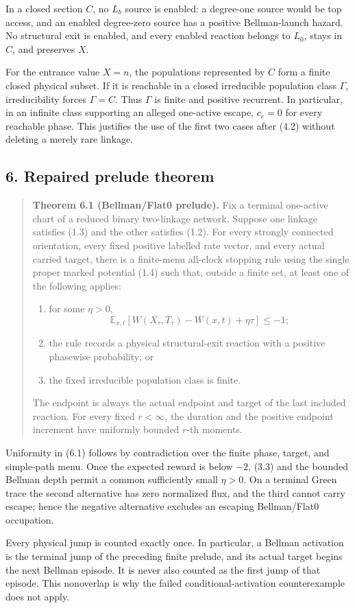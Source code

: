 In a closed section \(C\), no \(L_b\) source is enabled: a degree-one
source would be top access, and an enabled degree-zero source has a
positive Bellman-launch hazard. No structural exit is enabled, and every
enabled reaction belongs to \(L_0\), stays in \(C\), and preserves
\(X\).

For the entrance value \(X=n\), the populations represented by \(C\)
form a finite closed physical subset. If it is reachable in a closed
irreducible population class \(\Gamma\), irreducibility forces
\(\Gamma=C\). Thus \(\Gamma\) is finite and positive recurrent. In
particular, in an infinite class supporting an alleged one-active
escape, \(c_e=0\) for every reachable phase. This justifies the use of
the first two cases after (4.2) without deleting a merely rare linkage.

\subsection{6. Repaired prelude theorem}

\begin{quote}
\textbf{Theorem 6.1 (Bellman/Flat0 prelude).} Fix a terminal one-active
chart of a reduced binary two-linkage network. Suppose one linkage
satisfies (1.3) and the other satisfies (1.2). For every strongly
connected orientation, every fixed positive labelled rate vector, and
every actual carried target, there is a finite-menu all-clock stopping
rule using the single proper marked potential (1.4) such that, outside a
finite set, at least one of the following applies:

\begin{enumerate}
\def\labelenumi{\arabic{enumi}.}
\tightlist
\item
  for some \(\eta>0\), \[
     \mathbb E_{x,t}[W(X_\tau,T_\tau)-W(x,t)+\eta\tau]\le-1; \tag{6.1}
  \]
\item
  the rule records a physical structural-exit reaction with a positive
  phasewise probability; or
\item
  the fixed irreducible population class is finite.
\end{enumerate}

The endpoint is always the actual endpoint and target of the last
included reaction. For every fixed \(r<\infty\), the duration and the
positive endpoint increment have uniformly bounded \(r\)-th moments.
\end{quote}

Uniformity in (6.1) follows by contradiction over the finite phase,
target, and simple-path menu. Once the expected reward is below \(-2\),
(3.3) and the bounded Bellman depth permit a common sufficiently small
\(\eta>0\). On a terminal Green trace the second alternative has zero
normalized flux, and the third cannot carry escape; hence the negative
alternative excludes an escaping Bellman/Flat0 occupation.

Every physical jump is counted exactly once. In particular, a Bellman
activation is the terminal jump of the preceding finite prelude, and its
actual target begins the next Bellman episode. It is never also counted
as the first jump of that episode. This nonoverlap is why the failed
conditional-activation counterexample does not apply.
